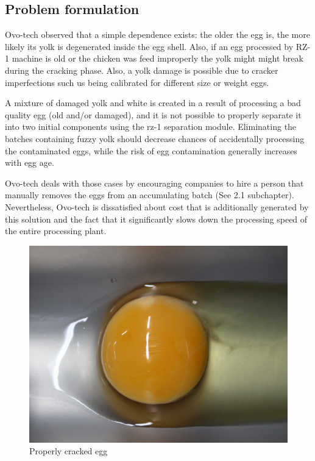 \documentclass[12pt,twoside,a4paper]{article}
\begin{document}
\subsection{Problem formulation}
Ovo-tech observed that a simple dependence exists: the older the egg is, the more likely its yolk is degenerated inside the egg shell. Also, if an egg processed by RZ-1 machine is old or the chicken was feed improperly the yolk might might break during the cracking phase.
Also, a yolk damage is possible due to cracker imperfections such us being calibrated for different size or weight eggs.

A mixture of damaged yolk and white is created in a result of processing a bad quality egg (old and/or damaged), and it is not possible to properly separate it into two initial components using the rz-1 separation module.
Eliminating the batches containing fuzzy yolk should decrease chances of accidentally processing the contaminated eggs, while the risk of egg contamination generally increases with egg age.

Ovo-tech deals with those cases by encouraging companies to hire a person that manually removes the eggs from an accumulating batch (See 2.1 subchapter). Nevertheless, Ovo-tech is dissatisfied about cost that is additionally generated by this solution and the fact that it significantly slows down the processing speed of the entire processing plant.
\begin{figure}[H]
\centering
\includegraphics[width=0.4\paperwidth]{prop}
\caption{Properly cracked egg}
\end{figure} 
\end{document}
